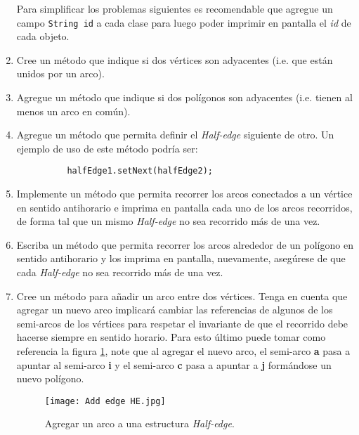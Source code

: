 \begin{Exercise}[title={Estructura \textit{Half-edge}}]
\begin{enumerate}
        Para simplificar los problemas siguientes es recomendable que agregue un campo 
        \texttt{String id} a cada clase para luego poder imprimir en pantalla el 
        \textit{id} de cada objeto.
      
      \item Cree un método que indique si dos vértices son adyacentes (i.e. que están 
        unidos por un arco).
      
      \item Agregue un método que indique si dos polígonos son adyacentes (i.e. tienen al 
        menos un arco en común).
        
      \item Agregue un método que permita definir el \textit{Half-edge} siguiente de otro.
        Un ejemplo de uso de este método podría ser:
        
        \begin{verbatim}
          halfEdge1.setNext(halfEdge2);
        \end{verbatim}

      \item Implemente un método que permita recorrer los arcos conectados a un vértice en 
        sentido antihorario e imprima en pantalla cada uno de los arcos recorridos, de 
        forma tal que un mismo \textit{Half-edge} no sea recorrido más de una vez.
      
      \item Escriba un método que permita recorrer los arcos alrededor de un polígono en 
        sentido antihorario y los imprima en pantalla, nuevamente, asegúrese de que cada 
        \textit{Half-edge} no sea recorrido más de una vez.
      
      \item Cree un método para añadir un arco entre dos vértices. 
        Tenga en cuenta que agregar un nuevo arco implicará cambiar las referencias de 
        algunos de los semi-arcos de los vértices para respetar el invariante de que el 
        recorrido debe hacerse siempre en sentido horario.
        Para esto último puede tomar como referencia la figura \ref{fig:he-add-edge}, note
        que al agregar el nuevo arco, el semi-arco \textbf{a} pasa a apuntar al semi-arco
        \textbf{i} y el semi-arco \textbf{c} pasa a apuntar a \textbf{j} formándose un 
        nuevo polígono.
        \begin{figure}[ht!]
          \texttt{[image: Add edge HE.jpg]}
          \caption{Agregar un arco a una estructura \textit{Half-edge}.}
          \label{fig:he-add-edge}
        \end{figure}
      

\end{enumerate}
\end{Exercise}
